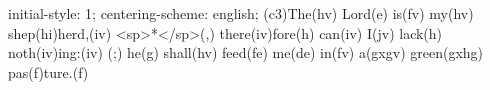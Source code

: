 initial-style: 1;
centering-scheme: english;
(c3)The(hv) Lord(e) is(fv) my(hv) shep(hi)herd,(iv) <sp>*</sp>(,) there(iv)fore(h) can(iv) I(jv) lack(h) noth(iv)ing:(iv) (;) he(g) shall(hv) feed(fe) me(de) in(fv) a(gxgv) green(gxhg) pas(f)ture.(f)

